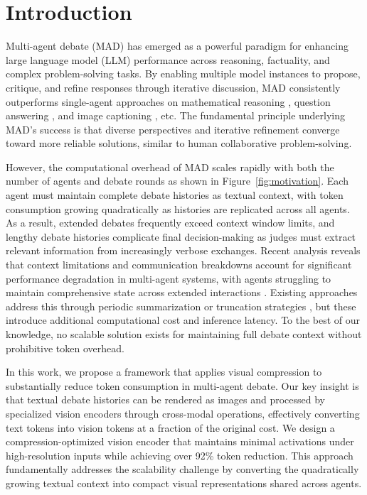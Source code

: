 \documentclass{article}
\theoremstyle{plain}
\theoremstyle{definition}
\theoremstyle{remark}
\begin{document}
\section{Introduction}
\label{Intro}
Multi-agent debate (MAD) has emerged as a powerful paradigm for enhancing large language model (LLM) performance across reasoning, factuality, and complex problem-solving tasks\cite{du2023improving,khan2024debating,liu2025breaking,wu2025unfixing,liang2023encouraging}. By enabling multiple model instances to propose, critique, and refine responses through iterative discussion, MAD consistently outperforms single-agent approaches on mathematical reasoning \cite{cobbe2021training}, question answering \cite{hendrycks2020measuring}, and image captioning \cite{lin2014microsoft, wu2025building, lin2024interpreting}, etc. The fundamental principle underlying MAD's success is that diverse perspectives and iterative refinement converge toward more reliable solutions, similar to human collaborative problem-solving.


However, the computational overhead of MAD scales rapidly with both the number of agents and debate rounds as shown in Figure~\ref{fig:motivation}. Each agent must maintain complete debate histories as textual context, with token consumption growing quadratically as histories are replicated across all agents. As a result, extended debates frequently exceed context window limits, and lengthy debate histories complicate final decision-making as judges must extract relevant information from increasingly verbose exchanges. Recent analysis reveals that context limitations and communication breakdowns account for significant performance degradation in multi-agent systems, with agents struggling to maintain comprehensive state across extended interactions \cite{cemri2025multi}. Existing approaches address this through periodic summarization or truncation strategies \cite{chen2024reconcile,liu2025breaking,wu2025unfixing}, but these introduce additional computational cost and inference latency. To the best of our knowledge, no scalable solution exists for maintaining full debate context without prohibitive token overhead.

In this work, we propose a framework that applies visual compression to substantially reduce token consumption in multi-agent debate. Our key insight is that textual debate histories can be rendered as images and processed by specialized vision encoders through cross-modal operations, effectively converting text tokens into vision tokens at a fraction of the original cost. We design a compression-optimized vision encoder that maintains minimal activations under high-resolution inputs while achieving over 92\% token reduction. This approach fundamentally addresses the scalability challenge by converting the quadratically growing textual context into compact visual representations shared across agents.
\end{document}
